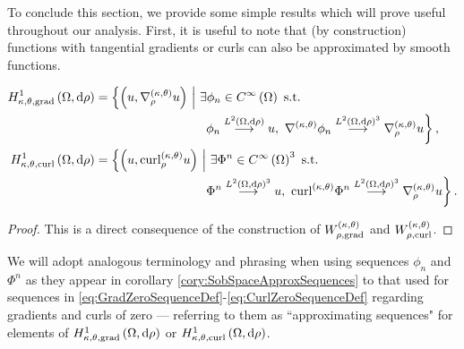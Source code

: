 To conclude this section, we provide some simple results which will prove useful throughout our analysis.
First, it is useful to note that (by construction) functions with tangential gradients or curls can also be approximated by smooth functions.
\begin{cory} \label{cory:SobSpaceApproxSequences}
	\begin{align*}
		\ktgradSob{\ddom}{\rho} &= \clbracs{ \bracs{u, \ktgrad_{\rho}u} \setVert \exists\phi_n\in\smooth{\ddom} \text{ s.t. } \right. \\ 
		&\hspace{0.25\textwidth} \left. \phi_n\lconv{\ltwo{\ddom}{\rho}}u, \ \ktgrad\phi_n\lconv{\ltwo{\ddom}{\rho}^3}\ktgrad_{\rho}u }, \\
		\ktcurlSob{\ddom}{\rho} &= \clbracs{ \bracs{u, \ktcurl{\rho}u} \setVert \exists\Phi^n\in\smooth{\ddom}^3 \text{ s.t. } \right. \\
		&\hspace{0.25\textwidth} \left. \Phi^n\lconv{\ltwo{\ddom}{\rho}^3}u, \ \ktcurl{}\Phi^n\lconv{\ltwo{\ddom}{\rho}^3}\ktgrad_{\rho}u }.
	\end{align*}
\end{cory}
\begin{proof}
	This is a direct consequence of the construction of $W^{\left( \kappa, \theta \right)}_{\rho,\mathrm{grad}}$ and $W^{\left( \kappa, \theta \right)}_{\rho,\mathrm{curl}}$.
\end{proof}
We will adopt analogous terminology and phrasing when using sequences $\phi_n$ and $\Phi^n$ as they appear in corollary \ref{cory:SobSpaceApproxSequences} to that used for sequences in \eqref{eq:GradZeroSequenceDef}-\eqref{eq:CurlZeroSequenceDef} regarding gradients and curls of zero --- referring to them as ``approximating sequences" for elements of $H^1_{\kappa,\theta,\mathrm{grad}}\left( \Omega, \mathrm{d}\rho \right)$ or $H^1_{\kappa,\theta,\mathrm{curl}}\left( \Omega, \mathrm{d}\rho \right)$.

